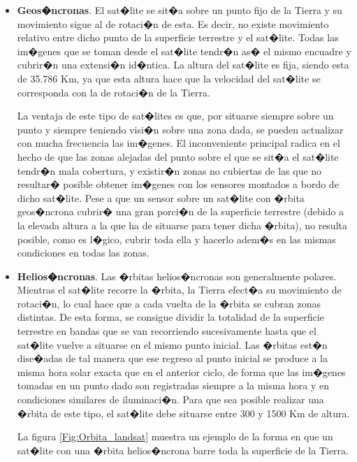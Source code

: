 \begin{itemize}
	\item \textbf{Geos�ncronas}. El sat�lite se sit�a sobre un punto fijo de la Tierra y su movimiento sigue al de rotaci�n de esta. Es decir, no existe movimiento relativo entre dicho punto de la superficie terrestre y el sat�lite. Todas las im�genes que se toman desde el sat�lite tendr�n as� el mismo encuadre y cubrir�n una extensi�n id�ntica. La altura del sat�lite es fija, siendo esta de 35.786 Km, ya que esta altura hace que la velocidad del sat�lite se corresponda con la de rotaci�n de la Tierra.
	
	
	La ventaja de este tipo de sat�lites es que, por situarse siempre sobre un punto y siempre teniendo visi�n sobre una zona dada, se pueden actualizar con mucha frecuencia las im�genes. El inconveniente principal radica en el hecho de que las zonas alejadas del punto sobre el que se sit�a el sat�lite tendr�n mala cobertura, y existir�n zonas no cubiertas de las que no resultar� posible obtener im�genes con los sensores montados a bordo de dicho sat�lite. Pese a que un sensor sobre un sat�lite con �rbita geos�ncrona cubrir� una gran porci�n de la superficie terrestre (debido a la elevada altura a la que ha de situarse para tener dicha �rbita), no resulta posible, como es l�gico, cubrir toda ella y hacerlo adem�s en las mismas condiciones en todas las zonas.
	
	\item \textbf{Helios�ncronas}. Las �rbitas helios�ncronas son generalmente polares. Mientras el sat�lite recorre la �rbita, la Tierra efect�a su movimiento de rotaci�n, lo cual hace que a cada vuelta de la �rbita se cubran zonas distintas. De esta forma, se consigue dividir la totalidad de la superficie terrestre en bandas que se van recorriendo sucesivamente hasta que el sat�lite vuelve a situarse en el mismo punto inicial. Las �rbitas est�n dise�adas de tal manera que ese regreso al punto inicial se produce a la misma hora solar exacta que en el anterior ciclo, de forma que las im�genes tomadas en un punto dado son registradas siempre a la misma hora y en condiciones similares de iluminaci�n. Para que sea posible realizar una �rbita de este tipo, el sat�lite debe situarse entre 300 y 1500 Km de altura.
	
	La figura \ref{Fig:Orbita_landsat} muestra un ejemplo de la forma en que un sat�lite con una �rbita helios�ncrona barre toda la superficie de la Tierra.
	

\end{itemize}
